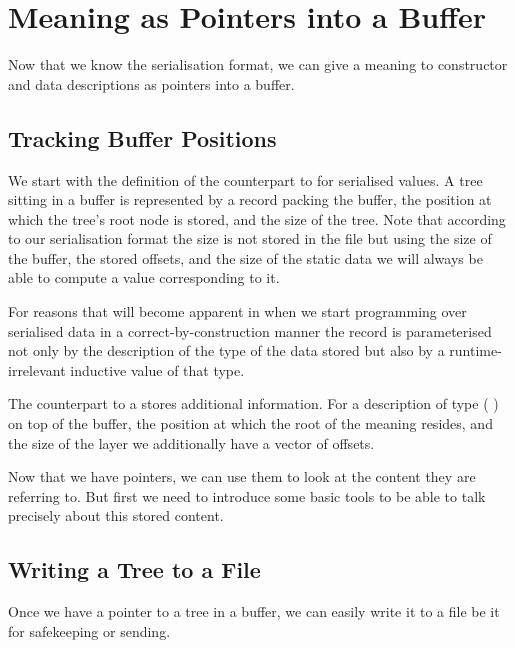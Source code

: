 \section{Meaning as Pointers into a Buffer}\label{sec:pointers}

Now that we know the serialisation format, we can give a meaning
to constructor and data descriptions as pointers into a buffer.

\subsection{Tracking Buffer Positions}

We start with the definition of the counterpart to 
for serialised values. A tree sitting in a buffer is represented
by a record packing the buffer, the position at which the tree's
root node is stored, and the size of the tree.
%
Note that according to our serialisation format the size is not stored
in the file but using the size of the buffer, the stored offsets,
and the size of the static data we will always
be able to compute a value corresponding to it.


For reasons that will become apparent in 
when we start programming over serialised data in a correct-by-construction
manner the record  is parameterised not only by the description
of the type of the data stored but also by a runtime-irrelevant inductive value of
that type.


The counterpart to a  stores additional information.
For a description of type (   )
on top of the buffer, the position at which the root of the meaning resides,
and the size of the layer we additionally have a vector of  offsets.

Now that we have pointers, we can use them to look at the content
they are referring to. But first we need to introduce some basic tools
to be able to talk precisely about this stored content.

\subsection{Writing a Tree to a File}

Once we have a pointer to a tree in a buffer, we can easily write it to a
file be it for safekeeping or sending.

